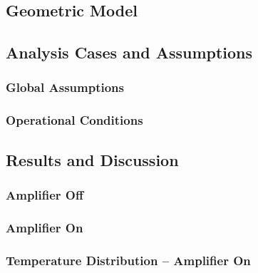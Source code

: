 \lipsum

\subsection{Geometric Model}
\label{sec:GeometricModel}

\lipsum

\subsection{Analysis Cases and Assumptions}
\label{sec:Analysis}

\lipsum

\subsubsection{Global Assumptions}
\label{subsec:Assumptions}

\lipsum

\subsubsection{Operational Conditions}
\label{subsec:OpConditions}

\lipsum

\subsection{Results and Discussion}
\label{sec:Results}

\lipsum

\subsubsection{Amplifier Off}
\label{sec:AmpOff}

\lipsum

\subsubsection{Amplifier On}
\label{sec:AmpOn}

\lipsum

\subsubsection{Temperature Distribution -- Amplifier On}
\label{sec:TempDist_AmpOn}

